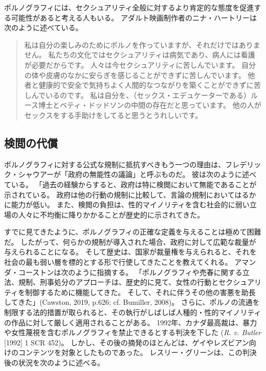 \documentclass[paper=a4,book,openany]{jlreq}
\newcommand{\ig}[1]{}           %
\begin{document}
ポルノグラフィには、セクシュアリティ全般に対するより肯定的な態度を促進する可能性があると考える人もいる。
アダルト映画制作者のニナ・ハートリーは次のように述べている。

\begin{quote}
私は自分の楽しみのためにポルノを作っていますが、それだけではありません。
私たちの文化ではセクシュアリティは病気であり、病人には看護が必要だからです。
人々は今セクシュアリティに苦しんでいます。
自分の体や皮膚のなかに安らぎを感じることができずに苦しんでいます。
他者と健康的で安全で気持ちよく人間的なつながりを築くことができずに苦しんでいるのです。
私は自分を、（セックス・エデュケーターである）ルース博士とベティ・ドッドソンの中間の存在だと思っています。
他の人がセックスをする手助けをしてると思うとうれしいです。
\citep{wischhover15:_why_im_still_doing_porn}
\end{quote}

\subsection{検閲の代償}

ポルノグラフィに対する公式な規制に抵抗すべきもう一つの理由は、フレデリック・シャウアーが「政府の無能性の議論」と呼ぶものだ。
彼は次のように述べている。
「過去の経験からすると、政府は特に検閲において無能であることが示されている。
政府は他の行動の規制に比較して、言論の規制においてはるかに能力が低い\citep[p.82]{schauer82:_free_speec}。
また、検閲の負担は、性的マイノリティを含む社会的に弱い立場の人々に不均衡に降りかかることが歴史的に示されてきた。

すでに見てきたように、ポルノグラフィの正確な定義を与えることは極めて困難だ。
したがって、何らかの規制が導入された場合、政府に対して広範な裁量が与えられることになる。
そして歴史は、国家が裁量権を与えられると、それを社会の最も弱い層を標的とする形で行使してきたことを教えてくれる。
アマンダ・コーストンは次のように指摘する。
「ポルノグラフィや売春に関する立法、規制、刑事処分のアプローチは、歴史的に見て、女性の行動とセクシュアリティを制御するために機能してきた。
そして、それに伴うその他の害悪を助長してきた」(Cawston, 2019, p.626; cf. Bumiller, 2008)。
\nocite{cawston19:_femin_case_pornog}\nocite{bumiller08:_in_abusiv_state}
さらに、ポルノの流通を制限する法的措置が取られると、その執行がしばしば人種的・性的マイノリティの作品に対して厳しく適用されることがある。
1992年、カナダ最高裁は、暴力や女性蔑視を含むポルノグラフィを禁止できるとする判決を下した
(\emph{R. v. Butler} [1992] 1 SCR 452)。
しかし、その後の摘発のほとんどは、ゲイやレズビアン向けのコンテンツを対象としたものであった\citep{mackinnon94:_statem_cathar}。
レスリー・グリーン\ig{Leslie Green}は、この判決後の状況を次のように述べる。
\end{document}
